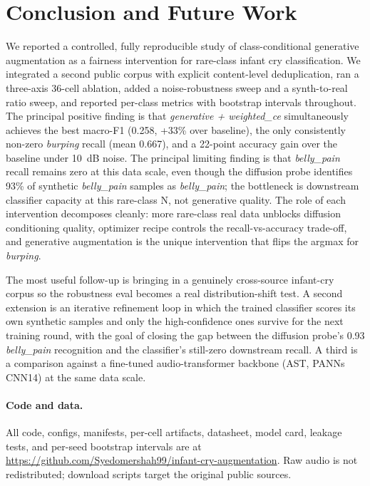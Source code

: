 \documentclass[final]{article}
\begin{document}
\section{Conclusion and Future Work}\label{sec:concl}
We reported a controlled, fully reproducible study of class-conditional generative augmentation as a fairness intervention for rare-class infant cry classification. We integrated a second public corpus with explicit content-level deduplication, ran a three-axis 36-cell ablation, added a noise-robustness sweep and a synth-to-real ratio sweep, and reported per-class metrics with bootstrap intervals throughout. The principal positive finding is that \textit{generative + weighted\_ce} simultaneously achieves the best macro-F1 (0.258, +33\% over baseline), the only consistently non-zero \textit{burping} recall (mean 0.667), and a 22-point accuracy gain over the baseline under 10~dB noise. The principal limiting finding is that \textit{belly\_pain} recall remains zero at this data scale, even though the diffusion probe identifies 93\% of synthetic \textit{belly\_pain} samples as \textit{belly\_pain}; the bottleneck is downstream classifier capacity at this rare-class N, not generative quality. The role of each intervention decomposes cleanly: more rare-class real data unblocks diffusion conditioning quality, optimizer recipe controls the recall-vs-accuracy trade-off, and generative augmentation is the unique intervention that flips the argmax for \textit{burping}.

The most useful follow-up is bringing in a genuinely cross-source infant-cry corpus so the robustness eval becomes a real distribution-shift test. A second extension is an iterative refinement loop in which the trained classifier scores its own synthetic samples and only the high-confidence ones survive for the next training round, with the goal of closing the gap between the diffusion probe's 0.93 \textit{belly\_pain} recognition and the classifier's still-zero downstream recall. A third is a comparison against a fine-tuned audio-transformer backbone (AST, PANNs CNN14) at the same data scale.

\paragraph{Code and data.} All code, configs, manifests, per-cell artifacts, datasheet, model card, leakage tests, and per-seed bootstrap intervals are at \url{https://github.com/Syedomershah99/infant-cry-augmentation}. Raw audio is not redistributed; download scripts target the original public sources.

\small


\end{document}

